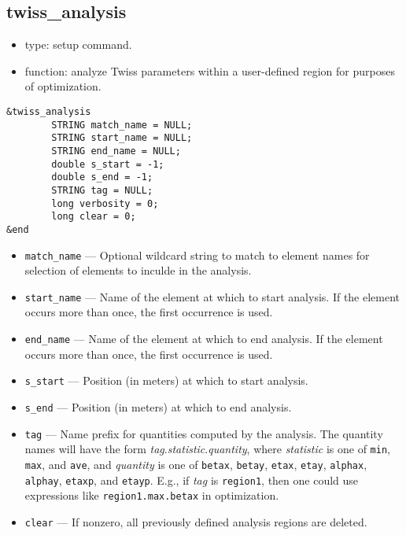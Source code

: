 \documentclass[11pt]{article}
\begin{document}
\subsection{twiss\_analysis \label{subsec:twissanalysis}}

\begin{itemize}
\item type: setup command.
\item function: analyze Twiss parameters within a user-defined region for purposes of
        optimization.
\end{itemize}

\begin{verbatim}
&twiss_analysis
        STRING match_name = NULL;
        STRING start_name = NULL;
        STRING end_name = NULL;
        double s_start = -1;
        double s_end = -1;
        STRING tag = NULL;
        long verbosity = 0;
        long clear = 0;
&end
\end{verbatim}

\begin{itemize}
\item \verb|match_name| --- Optional wildcard string to match to element names for selection
  of elements to inculde in the analysis.
\item \verb|start_name| --- Name of the element at which to start analysis.  If the
        element occurs more than once, the first occurrence is used.
\item \verb|end_name| --- Name of the element at which to end analysis.  If the
        element occurs more than once, the first occurrence is used.
\item \verb|s_start| --- Position (in meters) at which to start analysis.
\item \verb|s_end| --- Position (in meters) at which to end analysis.
\item \verb|tag| --- Name prefix for quantities computed by the analysis.  The quantity
        names will have the form {\em tag}.{\em statistic}.{\em quantity}, where {\em statistic}
        is one of \verb|min|, \verb|max|, and \verb|ave|, and {\em quantity} is one of
        \verb|betax|, \verb|betay|, \verb|etax|, \verb|etay|, \verb|alphax|, \verb|alphay|, 
        \verb|etaxp|, and \verb|etayp|. E.g., if {\em tag} is \verb|region1|,
        then one could use expressions like \verb|region1.max.betax| in optimization.
\item \verb|clear| --- If nonzero, all previously defined analysis regions are deleted.
\end{itemize}
\end{document}
